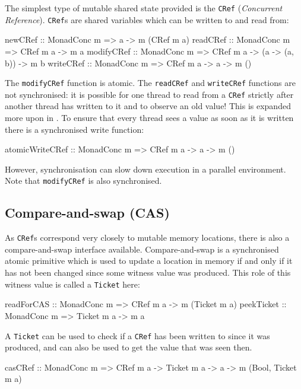 The simplest type of mutable shared state provided is the \verb|CRef|
(\emph{Concurrent Reference}). \verb|CRef|s are shared variables which
can be written to and read from:

\begin{haskellcode}
newCRef    :: MonadConc m => a -> m (CRef m a)
readCRef   :: MonadConc m => CRef m a -> m a
modifyCRef :: MonadConc m => CRef m a -> (a -> (a, b)) -> m b
writeCRef  :: MonadConc m => CRef m a -> a -> m ()
\end{haskellcode}

The \verb|modifyCRef| function is atomic. The \verb|readCRef| and
\verb|writeCRef| functions are not synchronised: it is possible for
one thread to read from a \verb|CRef| strictly after another thread
has written to it and to observe an old value!  This is expanded more
upon in . To ensure that every thread sees a
value as soon as it is written there is a synchronised write function:

\begin{haskellcode}
atomicWriteCRef :: MonadConc m => CRef m a -> a -> m ()
\end{haskellcode}

However, synchronisation can slow down execution in a parallel
environment. Note that \verb|modifyCRef| is also synchronised.

\subsection{Compare-and-swap (CAS)}
\label{sec:abstraction-typeclass-cas}

As \verb|CRef|s correspond very closely to mutable memory locations,
there is also a compare-and-swap interface available. Compare-and-swap
is a synchronised atomic primitive which is used to update a location
in memory if and only if it has not been changed since some witness
value was produced. This role of this witness value is called a
\verb|Ticket| here:

\begin{haskellcode}
readForCAS :: MonadConc m => CRef m a -> m (Ticket m a)
peekTicket :: MonadConc m => Ticket m a -> m a
\end{haskellcode}

A \verb|Ticket| can be used to check if a \verb|CRef| has been written
to since it was produced, and can also be used to get the value that
was seen then.

\begin{haskellcode}
casCRef :: MonadConc m => CRef m a -> Ticket m a -> a -> m (Bool, Ticket m a)
\end{haskellcode}

